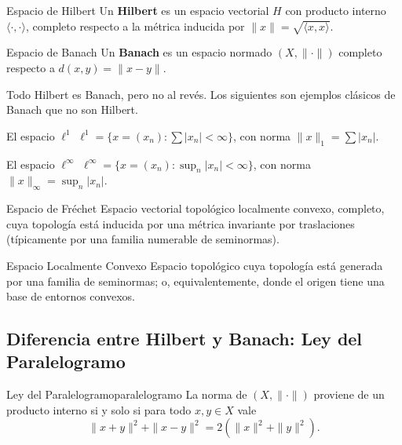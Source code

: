 \documentclass[11pt, a4paper]{article}
\begin{document}
\begin{definicion}{Espacio de Hilbert}{}
Un \textbf{Hilbert} es un espacio vectorial $H$ con producto interno $\langle\cdot, \cdot\rangle$, completo
respecto a la métrica inducida por $\|x\| = \sqrt{\langle x, x \rangle}$.
\end{definicion}

\begin{definicion}{Espacio de Banach}{}
Un \textbf{Banach} es un espacio normado $(X, \|\cdot\|)$ completo respecto a $d(x,y) = \|x-y\|$.
\end{definicion}

Todo Hilbert es Banach, pero no al revés. Los siguientes son ejemplos clásicos de Banach que no
son Hilbert.

\begin{ejemplo}{El espacio $\ell^1$}{}
$\ell^1 = \{x = (x_n) : \sum |x_n| < \infty\}$, con norma $\|x\|_1 = \sum |x_n|$.
\end{ejemplo}

\begin{ejemplo}{El espacio $\ell^\infty$}{}
$\ell^\infty = \{x = (x_n) : \sup_n |x_n| < \infty\}$, con norma $\|x\|_\infty = \sup_n |x_n|$.
\end{ejemplo}

\begin{definicion}{Espacio de Fréchet}{}
Espacio vectorial topológico localmente convexo, completo, cuya topología está inducida por
una métrica invariante por traslaciones (típicamente por una familia numerable de seminormas).
\end{definicion}

\begin{definicion}{Espacio Localmente Convexo}{}
Espacio topológico cuya topología está generada por una familia de seminormas; o,
equivalentemente, donde el origen tiene una base de entornos convexos.
\end{definicion}

\subsection{Diferencia entre Hilbert y Banach: Ley del Paralelogramo}

\begin{teorema}{Ley del Paralelogramo}{paralelogramo}
La norma de $(X, \|\cdot\|)$ proviene de un producto interno si y solo si para todo $x, y \in X$
vale
$$ \|x + y\|^2 + \|x - y\|^2 = 2(\|x\|^2 + \|y\|^2). $$
\end{teorema}
\end{document}
